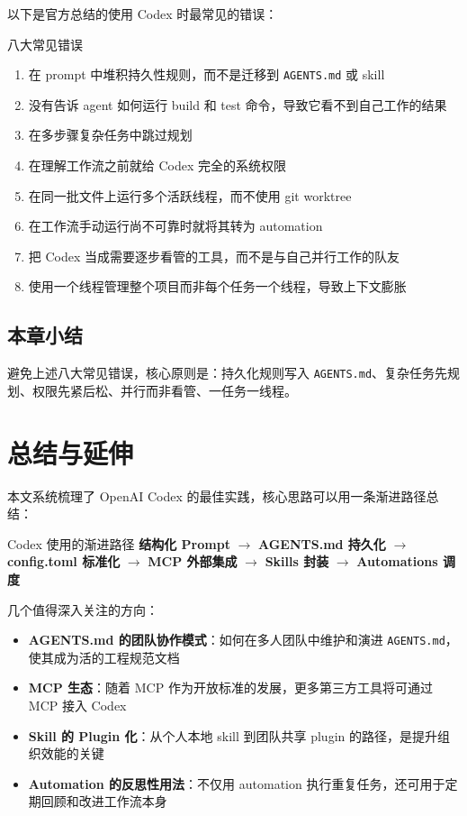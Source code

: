 \documentclass[a4paper]{article}
\begin{document}
以下是官方总结的使用 Codex 时最常见的错误：

\begin{warningbox}{八大常见错误}
\begin{enumerate}[nosep]
    \item 在 prompt 中堆积持久性规则，而不是迁移到 \texttt{AGENTS.md} 或 skill
    \item 没有告诉 agent 如何运行 build 和 test 命令，导致它看不到自己工作的结果
    \item 在多步骤复杂任务中跳过规划
    \item 在理解工作流之前就给 Codex 完全的系统权限
    \item 在同一批文件上运行多个活跃线程，而不使用 git worktree
    \item 在工作流手动运行尚不可靠时就将其转为 automation
    \item 把 Codex 当成需要逐步看管的工具，而不是与自己并行工作的队友
    \item 使用一个线程管理整个项目而非每个任务一个线程，导致上下文膨胀
\end{enumerate}
\end{warningbox}

\subsection{本章小结}

避免上述八大常见错误，核心原则是：持久化规则写入 \texttt{AGENTS.md}、复杂任务先规划、权限先紧后松、并行而非看管、一任务一线程。

\section{总结与延伸}

本文系统梳理了 OpenAI Codex 的最佳实践，核心思路可以用一条渐进路径总结：

\begin{importantbox}{Codex 使用的渐进路径}
\textbf{结构化 Prompt} $\rightarrow$ \textbf{AGENTS.md 持久化} $\rightarrow$ \textbf{config.toml 标准化} $\rightarrow$ \textbf{MCP 外部集成} $\rightarrow$ \textbf{Skills 封装} $\rightarrow$ \textbf{Automations 调度}
\end{importantbox}

几个值得深入关注的方向：

\begin{itemize}
    \item \textbf{AGENTS.md 的团队协作模式}：如何在多人团队中维护和演进 \texttt{AGENTS.md}，使其成为活的工程规范文档
    \item \textbf{MCP 生态}：随着 MCP 作为开放标准的发展，更多第三方工具将可通过 MCP 接入 Codex
    \item \textbf{Skill 的 Plugin 化}：从个人本地 skill 到团队共享 plugin 的路径，是提升组织效能的关键
    \item \textbf{Automation 的反思性用法}：不仅用 automation 执行重复任务，还可用于定期回顾和改进工作流本身
\end{itemize}
\end{document}
